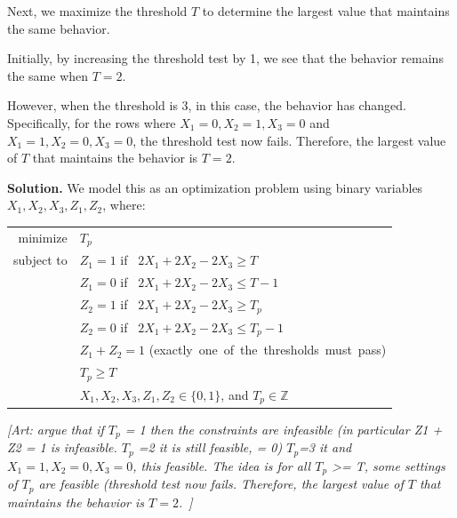 \documentclass[]{article}
\newcommand{\art}[1]{{\color{red} \textit{[Art: #1~]}}}
\begin{document}
Next, we maximize the threshold \(T\) to determine the largest value that maintains the same behavior.


Initially, by increasing the threshold test by 1, we see that the behavior remains the same when \(T = 2\). 

However, when the threshold is 3, in this case, the behavior has changed. Specifically, for the rows where \(X_1 = 0, X_2 = 1, X_3 = 0\) and \(X_1 = 1, X_2 = 0, X_3 = 0\), the threshold test now fails. Therefore, the largest value of \(T\) that maintains the behavior is \(T = 2\).

\textbf{Solution.} We model this as an optimization problem using binary variables \(X_1, X_2, X_3, Z_1, Z_2\), where:
\begin{center}
\begin{tabular}{rl}
minimize   & \(T_p\) \\
subject to & 
  $Z_1 = 1$ \mbox{\quad if \quad} $2 X_1 + 2 X_2 - 2 X_3 \ge T$ \\
& $Z_1 = 0$ \mbox{\quad if \quad} $2 X_1 + 2 X_2 - 2 X_3 \le T-1$ \\
& $Z_2 = 1$ \mbox{\quad if \quad} $2 X_1 + 2 X_2 - 2 X_3 \ge T_p$ \\
& $Z_2 = 0$ \mbox{\quad if \quad} $2 X_1 + 2 X_2 - 2 X_3 \le T_p-1$ \\
& $Z_1 + Z_2 = 1$ \mbox{\quad (exactly one  of the thresholds must pass)} \\
& $T_p \ge T$ \\
& $X_1, X_2, X_3, Z_1, Z_2 \in \{0,1\}$, and $T_p \in \mathbb{Z}$
\end{tabular}
\end{center}

\art{argue that if \(T_p\)  = 1 then the constraints are infeasible (in particular Z1 + Z2 = 1 is infeasible.  \(T_p\) =2 it is still feasible,  = 0) \(T_p\)=3 it and \(X_1 = 1, X_2 = 0, X_3 = 0\), this feasible.  The idea is for all \(T_p\) >= T, some settings of \(T_p\) are feasible (threshold test now fails. Therefore, the largest value of \(T\) that maintains the behavior is \(T = 2\).}
\end{document}
